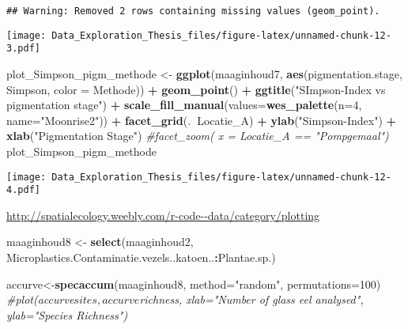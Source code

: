 \documentclass[]{article}
\newenvironment{Shaded}{\begin{snugshade}}{\end{snugshade}}
\newcommand{\KeywordTok}[1]{\textcolor[rgb]{0.13,0.29,0.53}{\textbf{#1}}}
\newcommand{\DataTypeTok}[1]{\textcolor[rgb]{0.13,0.29,0.53}{#1}}
\newcommand{\DecValTok}[1]{\textcolor[rgb]{0.00,0.00,0.81}{#1}}
\newcommand{\StringTok}[1]{\textcolor[rgb]{0.31,0.60,0.02}{#1}}
\newcommand{\CommentTok}[1]{\textcolor[rgb]{0.56,0.35,0.01}{\textit{#1}}}
\newcommand{\OperatorTok}[1]{\textcolor[rgb]{0.81,0.36,0.00}{\textbf{#1}}}
\newcommand{\NormalTok}[1]{#1}
\begin{document}
\begin{verbatim}
## Warning: Removed 2 rows containing missing values (geom_point).
\end{verbatim}

\texttt{[image: Data\_Exploration\_Thesis\_files/figure-latex/unnamed-chunk-12-3.pdf]}

\begin{Shaded}
\begin{Highlighting}[]
\NormalTok{plot_Simpson_pigm_methode <-}\StringTok{ }\KeywordTok{ggplot}\NormalTok{(maaginhoud7, }\KeywordTok{aes}\NormalTok{(pigmentation.stage, Simpson, }\DataTypeTok{color =}\NormalTok{ Methode)) }\OperatorTok{+}
\StringTok{  }\KeywordTok{geom_point}\NormalTok{() }\OperatorTok{+}
\StringTok{  }\KeywordTok{ggtitle}\NormalTok{(}\StringTok{"SImpson-Index vs pigmentation stage"}\NormalTok{) }\OperatorTok{+}
\StringTok{  }\KeywordTok{scale_fill_manual}\NormalTok{(}\DataTypeTok{values=}\KeywordTok{wes_palette}\NormalTok{(}\DataTypeTok{n=}\DecValTok{4}\NormalTok{, }\DataTypeTok{name=}\StringTok{"Moonrise2"}\NormalTok{)) }\OperatorTok{+}\StringTok{ }
\StringTok{  }\KeywordTok{facet_grid}\NormalTok{(.}\OperatorTok{~}\NormalTok{Locatie_A) }\OperatorTok{+}
\StringTok{  }\KeywordTok{ylab}\NormalTok{(}\StringTok{"Simpson-Index"}\NormalTok{) }\OperatorTok{+}
\StringTok{  }\KeywordTok{xlab}\NormalTok{(}\StringTok{"Pigmentation Stage"}\NormalTok{)}
  \CommentTok{#facet_zoom( x = Locatie_A == "Pompgemaal")}
\NormalTok{plot_Simpson_pigm_methode}
\end{Highlighting}
\end{Shaded}

\texttt{[image: Data\_Exploration\_Thesis\_files/figure-latex/unnamed-chunk-12-4.pdf]}

\url{http://spatialecology.weebly.com/r-code--data/category/plotting}

\begin{Shaded}
\begin{Highlighting}[]
\NormalTok{maaginhoud8 <-}\StringTok{ }\KeywordTok{select}\NormalTok{(maaginhoud2, Microplastics.Contaminatie.vezels..katoen..}\OperatorTok{:}\NormalTok{Plantae.sp.)}

\NormalTok{accurve<-}\KeywordTok{specaccum}\NormalTok{(maaginhoud8, }\DataTypeTok{method=}\StringTok{"random"}\NormalTok{, }\DataTypeTok{permutations=}\DecValTok{100}\NormalTok{)}
\CommentTok{#plot(accurve$sites, accurve$richness, xlab="Number of glass eel analysed", ylab="Species Richness")}
\end{Highlighting}
\end{Shaded}
\end{document}
